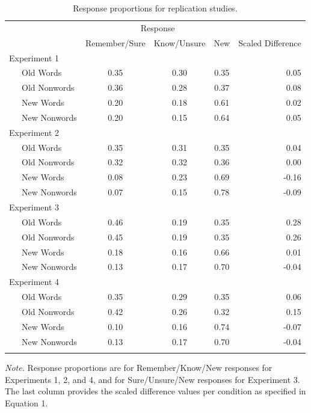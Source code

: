 \documentclass[english,,man,floatsintext]{apa6}
\begin{document}
\begin{table}[tbp]

\begin{center}
\begin{threeparttable}

\caption{\label{tab:tab-results}Response proportions for replication studies.}

\begin{tabular}{lcccr}
\toprule
 & \multicolumn{3}{c}{Response}  &\\
\cmidrule(r){2-4}
  & \multicolumn{1}{c}{Remember/Sure} & \multicolumn{1}{c}{Know/Unsure} & \multicolumn{1}{c}{New} & \multicolumn{1}{c}{Scaled Difference}\\
\midrule
Experiment 1 &  &  &  & \\
\ \ \ Old Words & 0.35 & 0.30 & 0.35 & 0.05\\
\ \ \ Old Nonwords & 0.36 & 0.28 & 0.37 & 0.08\\
\ \ \ New Words & 0.20 & 0.18 & 0.61 & 0.02\\
\ \ \ New Nonwords & 0.20 & 0.15 & 0.64 & 0.05\\
Experiment 2 &  &  &  & \\
\ \ \ Old Words & 0.35 & 0.31 & 0.35 & 0.04\\
\ \ \ Old Nonwords & 0.32 & 0.32 & 0.36 & 0.00\\
\ \ \ New Words & 0.08 & 0.23 & 0.69 & -0.16\\
\ \ \ New Nonwords & 0.07 & 0.15 & 0.78 & -0.09\\
Experiment 3 &  &  &  & \\
\ \ \ Old Words & 0.46 & 0.19 & 0.35 & 0.28\\
\ \ \ Old Nonwords & 0.45 & 0.19 & 0.35 & 0.26\\
\ \ \ New Words & 0.18 & 0.16 & 0.66 & 0.01\\
\ \ \ New Nonwords & 0.13 & 0.17 & 0.70 & -0.04\\
Experiment 4 &  &  &  & \\
\ \ \ Old Words & 0.35 & 0.29 & 0.35 & 0.06\\
\ \ \ Old Nonwords & 0.42 & 0.26 & 0.32 & 0.15\\
\ \ \ New Words & 0.10 & 0.16 & 0.74 & -0.07\\
\ \ \ New Nonwords & 0.13 & 0.17 & 0.70 & -0.04\\
\bottomrule
\addlinespace
\end{tabular}

\begin{tablenotes}[para]
\normalsize{\textit{Note.} Response proportions are for Remember/Know/New responses for Experiments 1, 2, and 4, and for Sure/Unsure/New responses for Experiment 3. The last column provides the scaled difference values per condition as specified in Equation 1.}
\end{tablenotes}

\end{threeparttable}
\end{center}

\end{table}
\end{document}
